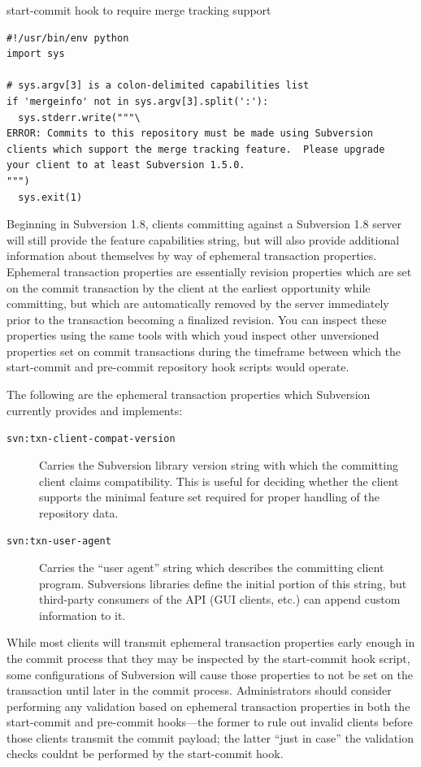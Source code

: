 \protect{}\label{svn.reposadmin.hooks.uses.ex-1}
start-commit hook to require merge tracking support

\begin{verbatim}
#!/usr/bin/env python
import sys

# sys.argv[3] is a colon-delimited capabilities list
if 'mergeinfo' not in sys.argv[3].split(':'):
  sys.stderr.write("""\
ERROR: Commits to this repository must be made using Subversion
clients which support the merge tracking feature.  Please upgrade
your client to at least Subversion 1.5.0.
""")
  sys.exit(1)
\end{verbatim}

Beginning in Subversion 1.8, clients committing against a Subversion 1.8
server will still provide the feature capabilities string, but will also
provide additional information about themselves by way of ephemeral
transaction properties. Ephemeral transaction properties are essentially
revision properties which are set on the commit transaction by the
client at the earliest opportunity while committing, but which are
automatically removed by the server immediately prior to the transaction
becoming a finalized revision. You can inspect these properties using
the same tools with which you\textquotesingle d inspect other
unversioned properties set on commit transactions during the timeframe
between which the start-commit and pre-commit repository hook scripts
would operate.

The following are the ephemeral transaction properties which Subversion
currently provides and implements:

\begin{description}
\item[\texttt{svn:txn-client-compat-version}]
Carries the Subversion library version string with which the committing
client claims compatibility. This is useful for deciding whether the
client supports the minimal feature set required for proper handling of
the repository data.
\item[\texttt{svn:txn-user-agent}]
Carries the ``user agent'' string which describes the committing client
program. Subversion\textquotesingle s libraries define the initial
portion of this string, but third-party consumers of the API (GUI
clients, etc.) can append custom information to it.
\end{description}

While most clients will transmit ephemeral transaction properties early
enough in the commit process that they may be inspected by the
start-commit hook script, some configurations of Subversion will cause
those properties to not be set on the transaction until later in the
commit process. Administrators should consider performing any validation
based on ephemeral transaction properties in both the start-commit and
pre-commit hooks---the former to rule out invalid clients before those
clients transmit the commit payload; the latter ``just in case'' the
validation checks couldn\textquotesingle t be performed by the
start-commit hook.

